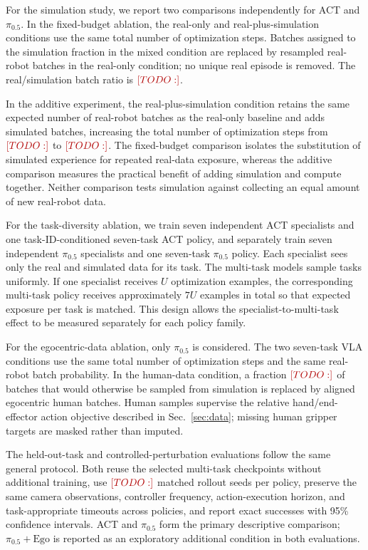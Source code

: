 \documentclass[10pt,conference]{IEEEtran}
\newcommand{\TODO}[1]{\textcolor{red!70!black}{[TODO: #1]}}
\begin{document}
For the simulation study, we report two comparisons independently for ACT and
$\pi_{0.5}$. In the fixed-budget ablation, the real-only and
real-plus-simulation conditions use the same total number of optimization steps.
Batches assigned to the simulation fraction in the mixed condition are replaced
by resampled real-robot batches in the real-only condition; no unique real
episode is removed. The real/simulation batch ratio is $\TODO{}$.

In the additive experiment, the real-plus-simulation condition retains the same
expected number of real-robot batches as the real-only baseline and adds
simulated batches, increasing the total number of optimization steps from
$\TODO{}$ to $\TODO{}$. The fixed-budget comparison isolates the substitution
of simulated experience for repeated real-data exposure, whereas the additive
comparison measures the practical benefit of adding simulation and compute
together. Neither comparison tests simulation against collecting an equal amount
of new real-robot data.

For the task-diversity ablation, we train seven independent ACT specialists and
one task-ID-conditioned seven-task ACT policy, and separately train seven
independent $\pi_{0.5}$ specialists and one seven-task $\pi_{0.5}$ policy. Each
specialist sees only the real and simulated data for its task. The multi-task
models sample tasks uniformly. If one specialist receives \(U\) optimization
examples, the corresponding multi-task policy receives approximately \(7U\)
examples in total so that expected exposure per task is matched. This design
allows the specialist-to-multi-task effect to be measured separately for each
policy family.

For the egocentric-data ablation, only $\pi_{0.5}$ is considered. The two
seven-task VLA conditions use the same total number of optimization steps and
the same real-robot batch probability. In the human-data condition, a fraction
$\TODO{}$ of batches that would otherwise be sampled from simulation is replaced
by aligned egocentric human batches. Human samples supervise the relative
hand/end-effector action objective described in Sec.~\ref{sec:data}; missing
human gripper targets are masked rather than imputed.

The held-out-task and controlled-perturbation evaluations follow the same
general protocol. Both reuse the selected multi-task checkpoints without
additional training, use $\TODO{}$ matched rollout seeds per policy, preserve
the same camera observations, controller frequency, action-execution horizon,
and task-appropriate timeouts across policies, and report exact successes with
95\% confidence intervals.
ACT and $\pi_{0.5}$ form the primary descriptive comparison;
$\pi_{0.5}+\mathrm{Ego}$ is reported as an exploratory additional condition in
both evaluations.
\end{document}

